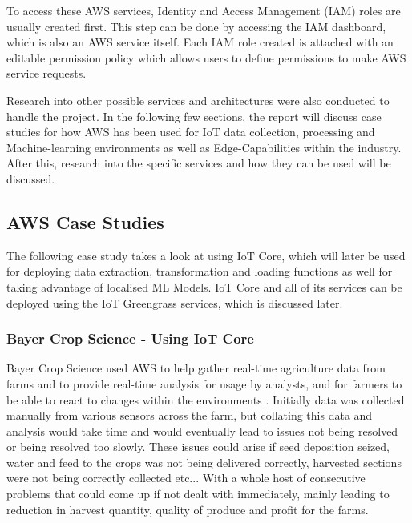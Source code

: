 To access these AWS services, Identity and Access Management (IAM) roles are usually created first. This step can be done by accessing the IAM dashboard, which is also an AWS service itself. Each IAM role created is attached with an editable permission policy which allows users to define permissions to make AWS service requests. 

Research into other possible services and architectures were also conducted to handle the project. In the following few sections, the report will discuss case studies for how AWS has been used for IoT data collection, processing and Machine-learning environments as well as Edge-Capabilities within the industry. After this, research into the specific services and how they can be used will be discussed.

\subsection{AWS Case Studies}

The following case study takes a look at using IoT Core, which will later be used for deploying data extraction, transformation and loading functions as well for taking advantage of localised ML Models. IoT Core and all of its services can be deployed using the IoT Greengrass services, which is discussed later.

\subsubsection{Bayer Crop Science - Using IoT Core}
Bayer Crop Science used AWS to help gather real-time agriculture data from farms and to provide real-time analysis for usage by analysts, and for farmers to be able to react to changes within the environments \cite{ch1_2_case_study_1}. Initially data was collected manually from various sensors across the farm, but collating this data and analysis would take time and would eventually lead to issues not being resolved or being resolved too slowly. These issues could arise if seed deposition seized, water and feed to the crops was not being delivered correctly, harvested sections were not being correctly collected etc... With a whole host of consecutive problems that could come up if not dealt with immediately, mainly leading to reduction in harvest quantity, quality of produce and profit for the farms.

